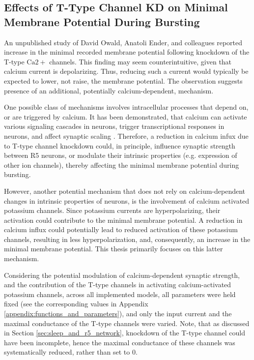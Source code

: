\documentclass[../main.tex]{subfiles}
\begin{document}
\subsection{Effects of T-Type Channel KD on Minimal Membrane Potential During Bursting}

\noindent An unpublished study of David Owald, Anatoli Ender, and colleagues reported increase in the minimal recorded membrane potential following knockdown of the T-type $\text{Ca}2+$ channels. This finding may seem counterintuitive, given that calcium current is depolarizing. Thus, reducing such a current would typically be expected to lower, not raise, the membrane potential. The observation suggests presence of an additional, potentially calcium-dependent, mechanism.

One possible class of mechanisms involves intracellular processes that depend on, or are triggered by calcium.
It has been demonstrated, that calcium can activate various signaling cascades in neurons, trigger transcriptional responses in neurons, and affect synaptic scaling \parencite{hagenstonFunctionalConsequencesCalciumDependent2020}. Therefore, a reduction in calcium infux due to T-type channel knockdown could, in principle, influence synaptic strength between R5 neurons,
or modulate their intrinsic properties (e.g. expression of other ion channels), thereby affecting the minimal membrane potential during bursting.

However, another potential mechanism that does not rely on calcium-dependent changes in intrinsic properties of neurons, is the involvement of calcium activated potassium channels. Since potassium currents are hyperpolarizing, their activation could contribute to the minimal membrane potential.  
A reduction in calcium influx could potentially lead to reduced activation of these potassium channels, resulting in less hyperpolarization, and, consequently, an increase in the minimal membrane potential. This thesis primarily focuses on this latter mechanism.

Considering the potential modulation of calcium-dependent synaptic strength, and the contribution of the T-type channels in activating calcium-activated potassium channels, across all implemented models, all parameters were held fixed (see the corresponding values in Appendix \ref{appendix:functions_and_parameters}), and only the input current and the maximal conductance of the T-type channels were varied. Note, that as discussed in Section \ref{sec:sleep_and_r5_network},
knockdown of the T-type channel could have been incomplete, hence the maximal conductance of these channels was systematically reduced, rather than set to $0$.
\end{document}
